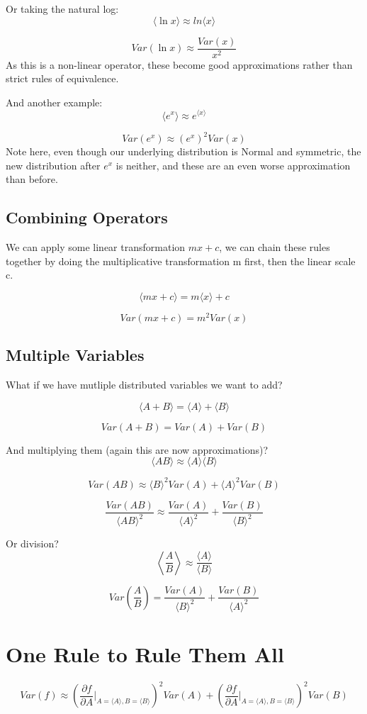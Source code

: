 Or taking the natural log:
\[
    \langle \ln x \rangle \approx ln \langle x \rangle
\]

\[
    Var(\ln x) \approx \frac{Var(x)}{x^2}
\]
As this is a non-linear operator, these become good approximations rather than strict rules of equivalence.

And another example:
\[
    \langle e^x \rangle \approx e^{\langle x\rangle}
\]

\[
    Var(e^x) \approx (e^x)^2 Var(x)
\]
Note here, even though our underlying distribution is Normal and symmetric, the new distribution after $e^x$ is neither, and these are an even worse approximation than before.

\subsection*{Combining Operators}
We can apply some linear transformation $mx + c$, we can chain these rules together by doing the multiplicative transformation m first, then the linear scale c.

\[
    \langle mx + c\rangle = m \langle x \rangle + c
\]

\[
    Var(mx+c) = m^2 Var(x)
\]

\subsection*{Multiple Variables}
What if we have mutliple distributed variables we want to add?

\[
    \langle A+B\rangle = \langle A \rangle + \langle B\rangle
\]

\[
    Var(A+B) = Var(A) + Var(B)
\]

And multiplying them (again this are now approximations)?
\[
    \langle AB\rangle \approx \langle A\rangle \langle B\rangle
\]

\[
    Var(AB) \approx \langle B\rangle^2 Var(A) + \langle A\rangle^2 Var(B)
\]

\[
    \frac{Var(AB)}{\langle AB\rangle^2} \approx \frac{Var(A)}{\langle A\rangle^2} + \frac{Var(B)}{\langle B\rangle^2}
\]

Or division?
\[
    \left\langle \frac{A}{B}\right\rangle \approx \frac{\langle A\rangle}{\langle B\rangle}
\]

\[
    Var\left(\frac{A}{B}\right) = \frac{Var(A)}{\langle B\rangle^2} + \frac{Var(B)}{\langle A\rangle^2}
\]

\section*{One Rule to Rule Them All}
\[
    Var(f) \approx \left(\frac{\partial f}{\partial A} \Bigr\rvert_{A = \langle A\rangle, B = \langle B\rangle}\right)^2 Var(A) + \left(\frac{\partial f}{\partial A} \Bigr\rvert_{A = \langle A\rangle, B = \langle B\rangle}\right)^2 Var(B)
\]



